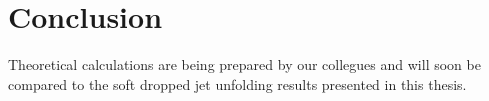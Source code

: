 

\clearpage

\chapter{Conclusion}\label{chap:conclusion}



Theoretical calculations are being prepared by our collegues and will soon be compared to the soft dropped jet unfolding results presented in this thesis.



